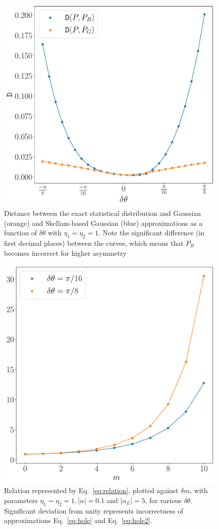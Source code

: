 \begin{figure}
    \centering
    \includegraphics[width=\linewidth]{pics/appendix/theta.pdf}
    \caption{Distance between the exact statistical distribution and Gaussian (orange) and Skellam-based Gaussian (blue) approximations as a function of $\delta\theta$ with $\eta_1=\eta_2=1$. Note the significant difference (in first decimal places) between the curves, which means that $P_B$ becomes incorrect for higher asymmetry}
    \label{fig:PB_PG}
\end{figure}

\begin{figure}
    \centering
    \includegraphics[width=0.75\linewidth]{pics/appendix/relation.pdf}
    \caption{Relation represented by Eq.~\eqref{eq:relation}, plotted against $\delta m$, with parameters $\eta_1=\eta_2=1, |\alpha|=0.1$ and $|\alpha_L|=5$, for various $\delta\theta$. Significant deviation from unity represents incorrectness of approximations Eq.~\eqref{eq:hole} and Eq.~\eqref{eq:hole2}.}
    \label{fig:relation}
\end{figure}